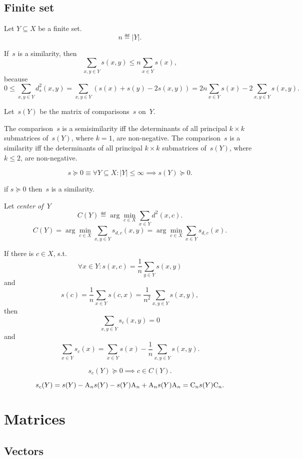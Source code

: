 \documentclass[10pt,a4paper]{article}
\theoremstyle{plain} \newtheorem{Lem}{Lemma}
\begin{document}
\subsection{Finite set}


Let $Y \subseteq X$ be a finite set.
$$ n \eqdef |Y|. $$

If~$s$ is a similarity, then
$$ \sum_{x,y \in Y} s(x,y) \le n \sum_{x \in Y} s(x), $$
because
$$ 0 \le \sum_{x,y \in Y} d_s^2(x,y) = \sum_{x,y \in Y} (s(x) + s(y) - 2 s(x,y)) = 2 n \sum_{x \in Y} s(x) - 2 \sum_{x,y \in Y} s(x,y). $$

Let~$s(Y)$ be the matrix of comparisons~$s$ on~$Y$.

The comparison~$s$ is a semisimilarity iff the determinants of all principal $k \times k$ submatrices of~$s(Y)$, where $k = 1$, are non-negative.
The comparison~$s$ is a similarity     iff the determinants of all principal $k \times k$ submatrices of~$s(Y)$, where $k \le 2$, are non-negative.

$$ s \succeq 0 \equiv \forall Y \subseteq X : |Y| \le \infty \implies s(Y) \succeq 0. $$

if $s \succeq 0$ then~$s$ is a similarity.

Let {\em center of~$Y$} 
$$ C(Y) \eqdef \arg \min_{c \in X} \sum_{x \in Y} d^2(x,c). $$
$$ C(Y) = \arg \min_{c \in X} \sum_{x,y \in Y}s_{d,c} (x,y) = \arg \min_{c \in X} \sum_{x \in Y}s_{d,c} (x). $$

If there is $c \in X$, s.t. 
$$ \forall x \in Y : s(x,c) = \frac 1 n \sum_{y \in Y} s(x,y) $$
and
$$ s(c) = \frac 1 n \sum_{x \in Y} s(c,x) = \frac 1 {n^2} \sum_{x,y \in Y} s(x,y), $$
then
$$ \sum_{x,y \in Y} s_c(x,y) = 0 $$
and 
$$ \sum_{x \in Y} s_c(x) = \sum_{x \in Y} s(x) - \frac 1 n \sum_{x,y \in Y} s(x,y). $$

$$ s_c(Y) \succeq 0 \implies c \in C(Y). $$

$$ s_c(Y) = s(Y) - \mathrm A_n s(Y) - s(Y) \mathrm A_n + \mathrm A_n s(Y) \mathrm A_n = \mathrm C_n s(Y) \mathrm C_n. $$




\section{Matrices}

\subsection{Vectors}
\end{document}
